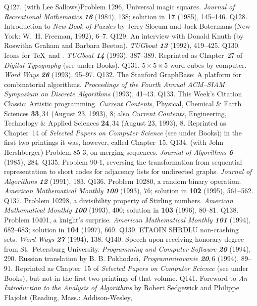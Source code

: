 \p Q127. (with Lee Sallows)\xskip Problem 1296, Universal magic squares.
 {\sl Journal of Recreational Mathematics\/ \bf 16} (1984), 138;
 solution in {\bf17} (1985), 145--146.
\p Q128. Introduction to {\sl New Book of Puzzles\/} by Jerry Slocum and
 Jack Botermans (New York: W.~H. Freeman, 1992), 6--7.
\p Q129. An interview with Donald Knuth (by Roswitha Graham and Barbara
 Beeton). {\sl TUGboat\/ \bf13} (1992), 419--425.
\p Q130. Icons for \TeX\ and \MF. {\sl TUGboat\/ \bf14} (1993), 387--389.
 Reprinted as Chapter~27 of {\sl Digital Typography\/} (see under Books).
\p Q131. $5\times5\times5$ word cubes by computer. {\sl Word Ways\/ \bf26}
 (1993), 95--97.
\p Q132. The Stanford GraphBase: A platform for combinatorial algorithms.
 {\sl Proceedings of the Fourth Annual ACM--SIAM Symposium on Discrete
 Algorithms\/} (1993), 41--43.
\p Q133. This Week's Citation Classic: Artistic programming. {\sl
 Current Contents}, Physical, Chemical \& Earth Sciences {\bf33},\,34
 (August 23, 1993), 8; also {\sl
 Current Contents}, Engineering, Technology \& Applied Sciences {\bf24},\,34
 (August 23, 1993), 8.
 Reprinted as Chapter~14 of {\sl Selected Papers on
 Computer Science\/} (see under Books); in the first two printings
 it was, however, called Chapter~15.
\p Q134. (with John Hershberger) Problem 85-3, on merging sequences.
 {\sl Journal of Algorithms\/ \bf 6} (1985), 284.
\p Q135. Problem 90-1, reversing the transformation from sequential
 representation to short codes for adjacency lists for undirected graphs.
 {\sl Journal of Algorithms\/ \bf12} (1991), 183.
\p Q136. Problem 10280, a random binary operation.
 {\sl American Mathematical Monthly\/ \bf100} (1993), 76;
 solution in {\bf102} (1995), 561--562.
\p Q137. Problem 10298, a divisibility property of Stirling numbers.
 {\sl American Mathematical Monthly\/ \bf100} (1993), 400;
 solution in {\bf103} (1996), 80--81.
\p Q138. Problem 10401, a knight's surprise.
 {\sl American Mathematical Monthly\/ \bf101} (1994), 682--683;
 solution in {\bf104} (1997), 669.
\p *Q139. ETAOIN SHRDLU non-crashing sets. {\sl Word Ways \bf27} (1994), 138.
\p Q140. Speech upon receiving honorary degree from St.~Petersburg University.
 {\sl Programming and Computer Software\/ \bf20} (1994), 290.
 Russian translation by B. B. Pokhodze\u\i, {\sl Programmirovanie\/
 \bf 20},\,6 (1994), 89--91.
 Reprinted as Chapter~15 of {\sl Selected Papers on
 Computer Science\/} (see under Books), but not in the first two printings
 of that volume.
\p Q141. Foreword to {\sl An Introduction to the Analysis of Algorithms\/} by
 Robert Sedgewick and Philippe Flajolet (Reading, Mass.: Addison-Wesley,
